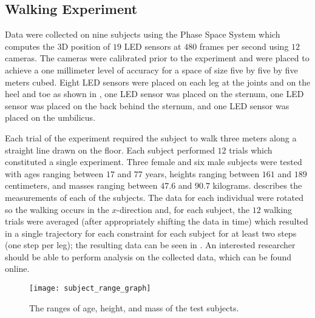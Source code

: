 \subsection{Walking Experiment} Data were collected on nine subjects using the Phase Space System\cite{phasespace}\xspace which computes the 3D position of $19$ LED sensors at $480$ frames per second using $12$ cameras. The cameras were calibrated prior to the experiment and were placed to achieve a one millimeter level of accuracy for a space of size five by five by five meters cubed. Eight LED sensors were placed on each leg at the joints and on the heel and toe as shown in , one LED sensor was placed on the sternum, one LED sensor was placed on the back behind the sternum, and one LED sensor was placed on the umbilicus.

Each trial of the experiment required the subject to walk three meters along a straight line drawn on the floor. Each subject performed $12$ trials which constituted a single experiment. Three female and six male subjects were tested with ages ranging between $17$ and $77$ years, heights ranging between $161$ and $189$ centimeters, and masses ranging between $47.6$ and $90.7$ kilograms.  describes the measurements of each of the subjects. The data for each individual were rotated so the walking occurs in the $x$-direction and, for each subject, the $12$ walking trials were averaged (after appropriately shifting the data in time) which resulted in a single trajectory for each constraint for each subject for at least two steps (one step per leg); the resulting data can be seen in . An interested researcher should be able to perform analysis on the collected data, which can be found online.\cite{ourdataset}

\begin{figure}[t!]
  \centering
  \texttt{[image: subject\_range\_graph]}
  \caption{The ranges of age, height, and mass of the test subjects.}
  \label{fig:subject-ranges}
\end{figure}

